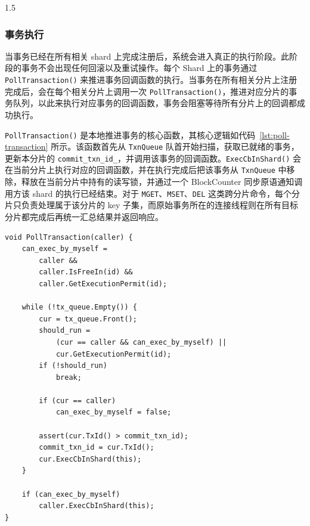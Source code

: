\documentclass[a4paper,12pt,fontset=none,twoside]{article}
\numberwithin{figure}{section}
\numberwithin{equation}{section}
\numberwithin{table}{section}
\begin{document}
\begin{spacing}{1.5}
	\subsubsection{事务执行}


	当事务已经在所有相关 shard 上完成注册后，系统会进入真正的执行阶段。此阶段的事务不会出现任何回滚以及重试操作。每个 Shard 上的事务通过 \texttt{PollTransaction()} 来推进事务回调函数的执行。当事务在所有相关分片上注册完成后，会在每个相关分片上调用一次 \texttt{PollTransaction()}，推进对应分片的事务队列，以此来执行对应事务的回调函数，事务会阻塞等待所有分片上的回调都成功执行。



	\texttt{PollTransaction()} 是本地推进事务的核心函数，其核心逻辑如代码~\ref{lst:poll-transaction} 所示。该函数首先从 \texttt{TxnQueue} 队首开始扫描，获取已就绪的事务，更新本分片的 \texttt{commit\_txn\_id\_}，并调用该事务的回调函数。\texttt{ExecCbInShard()} 会在当前分片上执行对应的回调函数，并在执行完成后把该事务从 \texttt{TxnQueue} 中移除，释放在当前分片中持有的读写锁，并通过一个 BlockCounter 同步原语通知调用方该 shard 的执行已经结束。对于 \texttt{MGET}、\texttt{MSET}、\texttt{DEL} 这类跨分片命令，每个分片只负责处理属于该分片的 key 子集，而原始事务所在的连接线程则在所有目标分片都完成后再统一汇总结果并返回响应。


\begin{listing}[!htb]
	\centering
	\begin{minipage}{0.80\textwidth}
	\begin{lstlisting}[style=idlecpp]
void PollTransaction(caller) {
    can_exec_by_myself =
        caller &&
        caller.IsFreeIn(id) &&
        caller.GetExecutionPermit(id);

    while (!tx_queue.Empty()) {
        cur = tx_queue.Front();
        should_run =
            (cur == caller && can_exec_by_myself) ||
            cur.GetExecutionPermit(id);
        if (!should_run)
            break;

        if (cur == caller)
            can_exec_by_myself = false;

        assert(cur.TxId() > commit_txn_id);
        commit_txn_id = cur.TxId();
        cur.ExecCbInShard(this);
    }

    if (can_exec_by_myself)
        caller.ExecCbInShard(this);
}
	\end{lstlisting}
	\end{minipage}
	\caption{\texttt{PollTransaction()} 的本地推进逻辑}
	\label{lst:poll-transaction}
	\end{listing}


\end{spacing}
\end{document}
